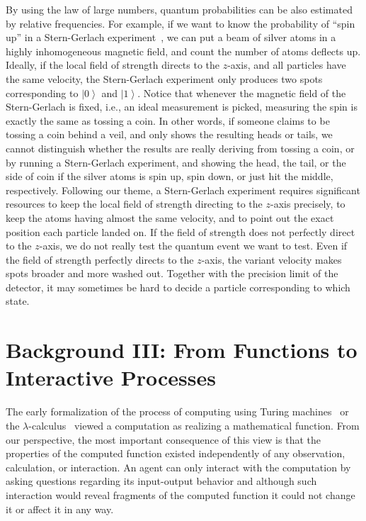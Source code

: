 \documentclass{article}
\theoremstyle{remark}
\newcommand{\ket}[1]{{\left\vert{#1}\right\rangle}}
\begin{document}
By using the law of large numbers, quantum probabilities can be also
estimated by relative frequencies. For example, if we want to know the
probability of ``spin up'' in a Stern-Gerlach
experiment~\cite{Stern1988,peres1995quantum,544199,Griffiths2003}, we
can put a beam of silver atoms in a highly inhomogeneous magnetic
field, and count the number of atoms deflects up. Ideally, if the
local field of strength directs to the $z$-axis, and all particles
have the same velocity, the Stern-Gerlach experiment only produces two
spots corresponding to $\ket{0}$ and $\ket{1}$. Notice that whenever
the magnetic field of the Stern-Gerlach is fixed, i.e., an ideal
measurement is picked, measuring the spin is exactly the same as
tossing a coin. In other words, if someone claims to be tossing a coin
behind a veil, and only shows the resulting heads or tails, we cannot
distinguish whether the results are really deriving from tossing a
coin, or by running a Stern-Gerlach experiment, and showing the head,
the tail, or the side of coin if the silver atoms is spin up, spin
down, or just hit the middle, respectively. Following our theme, a
Stern-Gerlach experiment requires significant resources to keep the
local field of strength directing to the $z$-axis precisely, to keep
the atoms having almost the same velocity, and to point out the exact
position each particle landed on. If the field of strength does not
perfectly direct to the $z$-axis, we do not really test the quantum
event we want to test. Even if the field of strength perfectly directs
to the $z$-axis, the variant velocity makes spots broader and more
washed out. Together with the precision limit of the detector, it may
sometimes be hard to decide a particle corresponding to which state.

\section{Background III: From Functions to Interactive Processes}

The early formalization of the process of computing using Turing
machines~\cite{citeulike:321509} or the
$\lambda$-calculus~\cite{Barendregt:Lambda} viewed a computation as
realizing a mathematical function. From our perspective, the most
important consequence of this view is that the properties of the
computed function existed independently of any observation,
calculation, or interaction. An agent can only interact with the
computation by asking questions regarding its input-output behavior
and although such interaction would reveal fragments of the computed
function it could not change it or affect it in any way.
\end{document}
